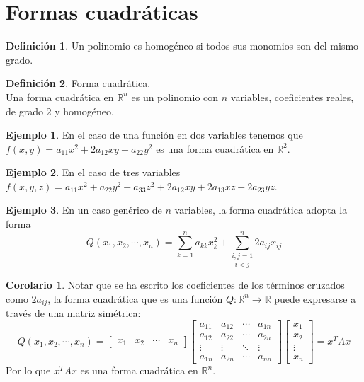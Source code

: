 \documentclass[10pt]{article}
\theoremstyle{definition}
\newtheorem{definition}{Definición}[section]
\newtheorem{corollary}{Corolario}[theorem]
\newtheorem{example}{Ejemplo}[section]
\begin{document}
\section{Formas cuadráticas}
\begin{definition}
    Un polinomio es homogéneo si todos sus monomios son del mismo grado.
\end{definition}
\begin{definition}{Forma cuadrática.}
    \\Una forma cuadrática en $\mathbb{R}^n$ es un polinomio con $n$ variables, coeficientes reales, de grado $2$ y homogéneo.
\end{definition}
\begin{example}
    En el caso de una función en dos variables tenemos que $f(x,y)=a_{11}x^2+2a_{12}xy+a_{22}y^2$ es una forma cuadrática en $\mathbb{R}^2$.
\end{example}
\begin{example}
    En el caso de tres variables $f(x,y,z)=a_{11}x^2+a_{22}y^2+a_{33}z^2+2a_{12}xy+2a_{13}xz+2a_{23}yz$.
\end{example}
\begin{example}
    En un caso genérico de $n$ variables, la forma cuadrática adopta la forma $$Q(x_1,x_2,\cdots,x_n)=\sum_{k=1}^{n} a_{kk}x^2_k+\underset{i< j}{\sum _{i,j=1}^{n}} 2a_{ij} x_{ij}$$
\end{example}
\begin{corollary}
    Notar que se ha escrito los coeficientes de los términos cruzados como $2a_{ij}$, la forma cuadrática que es una función $Q:\mathbb{R}^n\to\mathbb{R}$ puede expresarse a través de una matriz simétrica: $$Q(x_1,x_2,\cdots,x_n)=\begin{bmatrix}
x_{1} & x_{2} & \cdots  & x_{n}
\end{bmatrix}\begin{bmatrix}
a_{11} & a_{12} & \cdots  & a_{1n}\\
a_{12} & a_{22} & \cdots  & a_{2n}\\
\vdots  & \vdots  & \ddots  & \vdots \\
a_{1n} & a_{2n} & \cdots  & a_{nn}
\end{bmatrix}\begin{bmatrix}
x_{1}\\
x_{2}\\
\vdots \\
x_{n}
\end{bmatrix} =x^{T} Ax$$
Por lo que $x^TAx$ es una forma cuadrática en $\mathbb{R}^n$.
\end{corollary}
\end{document}
